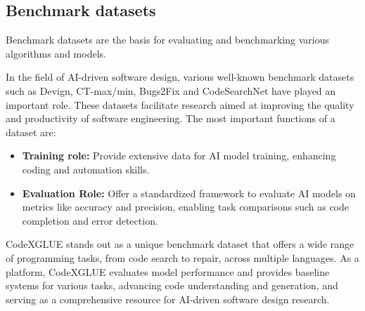 \documentclass{article}
\begin{document}
\subsection{Benchmark datasets}
Benchmark datasets are the basis for evaluating and benchmarking various algorithms and models.

In the field of AI-driven software design, various well-known benchmark datasets such as Devign\cite{devlin2019bert}, 
CT-max/min\cite{feng2020codebert}, Bugs2Fix\cite{tufano2019empirical} and CodeSearchNet\cite{husain2020codesearchnet}  have played an important role. 
These datasets facilitate research aimed at improving the 
quality and productivity of software engineering. The most important functions of a dataset are:

\begin{itemize}

\item \textbf{Training role:} Provide extensive data for AI model training, enhancing coding and automation skills.
\item \textbf{Evaluation Role:} 
Offer a standardized framework to evaluate AI models on metrics like accuracy and precision, enabling task comparisons such as code completion and error detection.
\end{itemize}



CodeXGLUE stands out as a unique benchmark dataset that offers a wide range of programming tasks, from code search to repair, 
across multiple languages. As a platform, CodeXGLUE evaluates model performance and provides baseline systems for various tasks, 
advancing code understanding and generation, and serving as a comprehensive resource for AI-driven software design research.\cite{lu2021codexglue}
\end{document}
